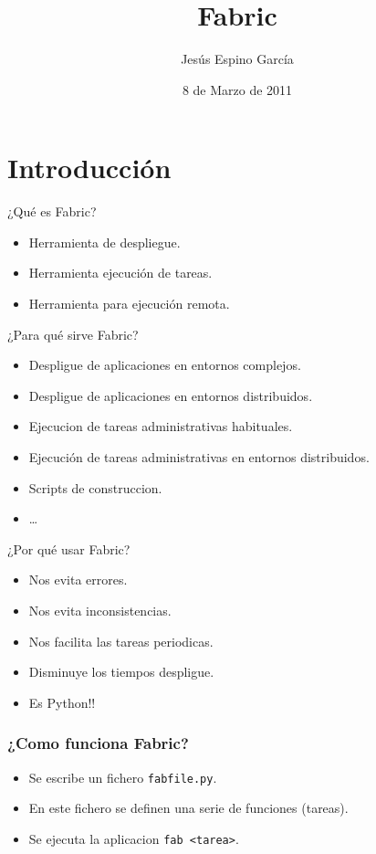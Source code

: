 \documentclass[10pt]{beamer}
\title{Fabric}
\author{Jesús Espino García}
\date{8 de Marzo de 2011}
\institute[GUL UC3M]{Python-ESP-Centro}
\begin{document}
  \frame{\maketitle}


  \section*{Introducción}
  \begin{frame}{¿Qué es Fabric?}
    \begin{itemize}
      \item Herramienta de despliegue.
      \item Herramienta ejecución de tareas.
      \item Herramienta para ejecución remota.
    \end{itemize}
  \end{frame}
  
  \begin{frame}{¿Para qué sirve Fabric?}
    \begin{itemize}
      \item Despligue de aplicaciones en entornos complejos.
      \item Despligue de aplicaciones en entornos distribuidos.
      \item Ejecucion de tareas administrativas habituales.
      \item Ejecución de tareas administrativas en entornos distribuidos.
      \item Scripts de construccion.
      \item \dots{}
    \end{itemize}
  \end{frame}
  
  \begin{frame}{¿Por qué usar Fabric?}
    \begin{itemize}
      \item Nos evita errores.
      \item Nos evita inconsistencias.
      \item Nos facilita las tareas periodicas.
      \item Disminuye los tiempos despligue.
      \item Es Python!!
    \end{itemize}
  \end{frame}

  \begin{frame}[containsverbatim]
    \frametitle{¿Como funciona Fabric?}
    \begin{itemize}
      \item Se escribe un fichero \verb+fabfile.py+.
      \item En este fichero se definen una serie de funciones (tareas).
      \item Se ejecuta la aplicacion \verb+fab <tarea>+.
    \end{itemize}
  \end{frame}
  
\end{document}
